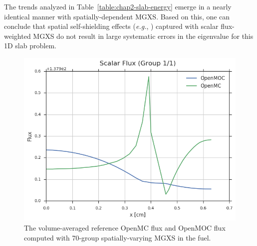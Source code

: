 The trends analyzed in Table~\ref{table:chap2-slab-energy} emerge in a nearly identical manner with spatially-dependent \ac{MGXS}. Based on this, one can conclude that spatial self-shielding effects (\textit{e.g.}, ) captured with scalar flux-weighted \ac{MGXS} do not result in large systematic errors in the eigenvalue for this 1D slab problem.

\begin{figure}[h!]
  \centering
  \includegraphics[width=0.9\linewidth]{figures/biases/slab/flux-group-1-1}
  \caption{}
\label{fig:chap2-slab-flux}
\caption[Spatially-varying scalar flux a 1D slab.]{The volume-averaged reference OpenMC flux and OpenMOC flux computed with 70-group spatially-varying \ac{MGXS} in the fuel.}
\end{figure}

